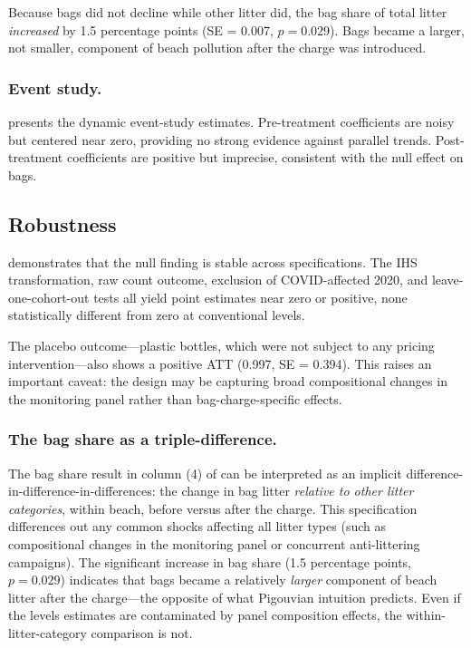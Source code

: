 \documentclass[12pt]{article}
\begin{document}
Because bags did not decline while other litter did, the bag share of total litter \textit{increased} by 1.5 percentage points (SE = 0.007, $p = 0.029$). Bags became a larger, not smaller, component of beach pollution after the charge was introduced.



\subsubsection*{Event study.}  presents the dynamic event-study estimates. Pre-treatment coefficients are noisy but centered near zero, providing no strong evidence against parallel trends. Post-treatment coefficients are positive but imprecise, consistent with the null effect on bags.



\subsection{Robustness}

 demonstrates that the null finding is stable across specifications. The IHS transformation, raw count outcome, exclusion of COVID-affected 2020, and leave-one-cohort-out tests all yield point estimates near zero or positive, none statistically different from zero at conventional levels.

The placebo outcome---plastic bottles, which were not subject to any pricing intervention---also shows a positive ATT (0.997, SE = 0.394). This raises an important caveat: the design may be capturing broad compositional changes in the monitoring panel rather than bag-charge-specific effects.

\subsubsection*{The bag share as a triple-difference.} The bag share result in column (4) of  can be interpreted as an implicit difference-in-difference-in-differences: the change in bag litter \textit{relative to other litter categories}, within beach, before versus after the charge. This specification differences out any common shocks affecting all litter types (such as compositional changes in the monitoring panel or concurrent anti-littering campaigns). The significant increase in bag share (1.5 percentage points, $p = 0.029$) indicates that bags became a relatively \textit{larger} component of beach litter after the charge---the opposite of what Pigouvian intuition predicts. Even if the levels estimates are contaminated by panel composition effects, the within-litter-category comparison is not.
\end{document}
